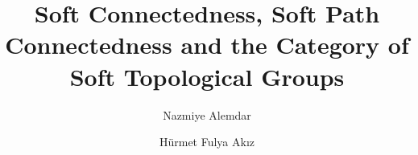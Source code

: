 \documentclass[preprint,12pt]{elsarticle}
\begin{document}
\begin{frontmatter}




\newtheorem{thm}{Theorem}[section]
\newtheorem{prop}[thm]{Proposition}
\newtheorem{lem}[thm]{Lemma}
\newtheorem{rem}[thm]{Remark}
\newtheorem{cor}[thm]{Corollary}
\newtheorem{exr}[thm]{Exercise}
\newtheorem{ex}[thm]{Example}
\newtheorem{defn}[thm]{Definition}

\title{Soft Connectedness, Soft Path Connectedness and the Category of Soft Topological Groups}


\author[inst1]{Nazmiye Alemdar}

\author[inst2]{H\"{u}rmet Fulya Ak{\i}z}


\end{frontmatter}
\end{document}
